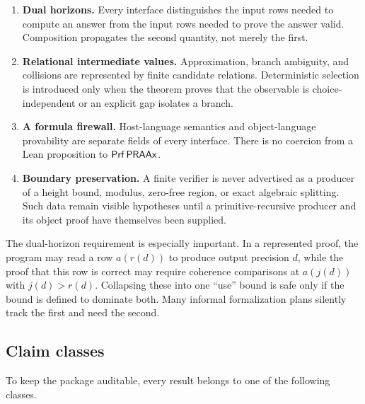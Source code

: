 \begin{enumerate}[label=(\roman*),leftmargin=2.4em]
\item \textbf{Dual horizons.}  Every interface distinguishes the input rows needed to
compute an answer from the input rows needed to prove the answer valid.  Composition
propagates the second quantity, not merely the first.
\item \textbf{Relational intermediate values.}  Approximation, branch ambiguity, and
collisions are represented by finite candidate relations.  Deterministic selection is
introduced only when the theorem proves that the observable is choice-independent or
an explicit gap isolates a branch.
\item \textbf{A formula firewall.}  Host-language semantics and object-language
provability are separate fields of every interface.  There is no coercion from a Lean
proposition to \(\mathsf{Prf}\,\mathsf{PRAAx}\).
\item \textbf{Boundary preservation.}  A finite verifier is never advertised as a
producer of a height bound, modulus, zero-free region, or exact algebraic splitting.
Such data remain visible hypotheses until a primitive-recursive producer and its
object proof have themselves been supplied.
\end{enumerate}

The dual-horizon requirement is especially important.  In a represented proof, the
program may read a row \(a(r(d))\) to produce output precision \(d\), while the proof
that this row is correct may require coherence comparisons at \(a(j(d))\) with
\(j(d)>r(d)\).  Collapsing these into one ``use'' bound is safe only if the bound is
defined to dominate both.  Many informal formalization plans silently track the first
and need the second.

\subsection{Claim classes}

To keep the package auditable, every result belongs to one of the following classes.

